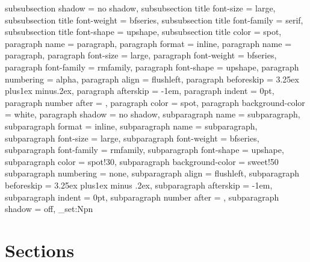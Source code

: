 {{{    subsubsection shadow                  = no shadow,
    subsubsection title font-size         = large,
    subsubsection title font-weight       = bfseries,
    subsubsection title font-family       = serif,
    subsubsection title font-shape        = upshape,
    subsubsection title color             = spot,
  }
\cxset
  {
    paragraph name                = paragraph,
    paragraph format              = inline,
    paragraph name                = paragraph,
    paragraph font-size           = large,
    paragraph font-weight         = bfseries,
    paragraph font-family         = rmfamily,
    paragraph font-shape          = upshape,
    paragraph numbering           = alpha,
    paragraph align               = flushleft,
    paragraph beforeskip          = 3.25ex plus1ex minus.2ex,
    paragraph afterskip           = -1em,
    paragraph indent              = 0pt,
    paragraph number after        = \quad,
    paragraph color               = spot,
    paragraph background-color    = white,
    paragraph shadow              = no shadow,
  }
\cxset
  {
    subparagraph name             = subparagraph,
    subparagraph format           = inline,
    subparagraph name             = subparagraph,
    subparagraph font-size        = large,
    subparagraph font-weight      = bfseries,
    subparagraph font-family      = rmfamily,
    subparagraph font-shape       = upshape,
    subparagraph color            = spot!30,
    subparagraph background-color = sweet!50
    subparagraph numbering        = none,
    subparagraph align            = flushleft,
    subparagraph beforeskip       = 3.25ex plus1ex minus .2ex,
    subparagraph afterskip        = -1em,
    subparagraph indent           = 0pt,
    subparagraph number after     = ,
    subparagraph shadow           = off,
  }
\ExplSyntaxOn
\cs_set:Npn \testsections
  {
    \section{Sections}
    \lorem\par
}}}
